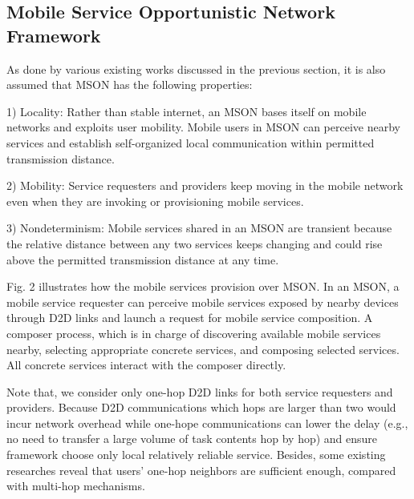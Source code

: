 \documentclass[journal]{IEEEtran}
\begin{document}
\subsection{Mobile Service Opportunistic Network Framework}
As done by various existing works discussed in the previous section, it is also assumed that MSON has the following properties:

1) Locality: Rather than stable internet, an MSON bases itself on mobile networks and exploits user mobility. Mobile users in MSON can perceive nearby services and establish self-organized local communication within permitted transmission distance.

2) Mobility: Service requesters and providers keep moving in the mobile network even when they are invoking or provisioning mobile services.

3) Nondeterminism: Mobile services shared in an MSON are transient because the relative distance between any two services keeps changing and could rise above the permitted transmission distance at any time. 

Fig. 2 illustrates how the mobile services provision over MSON. In an MSON, a mobile service requester can perceive mobile services exposed by nearby devices through D2D links and launch a request for mobile service composition. A composer process, which is in charge of discovering available mobile services nearby, selecting appropriate concrete services, and composing selected services. All concrete services interact with the composer directly.

Note that, we consider only one-hop D2D links for both service requesters and providers. 
Because D2D communications which hops are larger than two would incur network overhead \cite{li2014can} while one-hope communications can lower the delay (e.g., no need to transfer a large volume of task contents hop by hop) and ensure framework choose only local relatively reliable service. 
Besides, some existing researches \cite{chang2015progressive,tuncay2013participant,wu2013homing,jiang2016exploiting,liu2013exploring} reveal that users' one-hop neighbors are sufficient enough, compared with multi-hop mechanisms.
\end{document}
